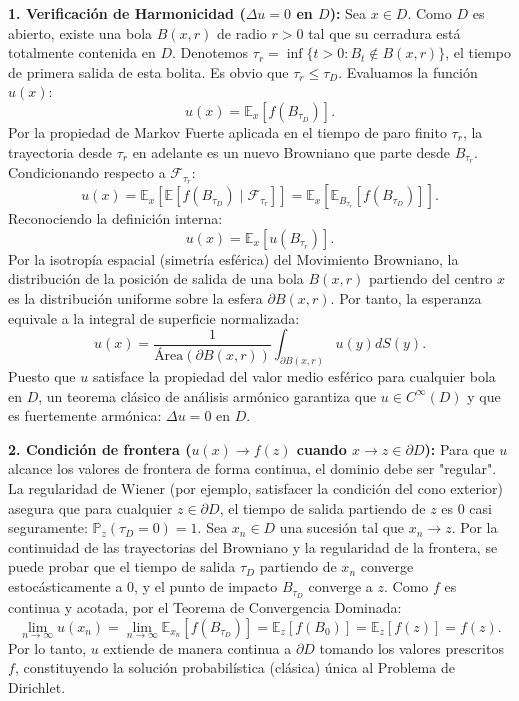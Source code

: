 \documentclass[11pt, letterpaper]{article}
\begin{document}
\begin{solucion}
    \textbf{1. Verificación de Harmonicidad ($\Delta u = 0$ en $D$):}
    Sea $x \in D$. Como $D$ es abierto, existe una bola $B(x, r)$ de radio $r > 0$ tal que su cerradura está totalmente contenida en $D$.
    Denotemos $\tau_r = \inf\{t > 0 : B_t \notin B(x, r)\}$, el tiempo de primera salida de esta bolita.
    Es obvio que $\tau_r \le \tau_D$.
    Evaluamos la función $u(x)$:
    \[ u(x) = \mathbb{E}_x[f(B_{\tau_D})]. \]
    Por la propiedad de Markov Fuerte aplicada en el tiempo de paro finito $\tau_r$, la trayectoria desde $\tau_r$ en adelante es un nuevo Browniano que parte desde $B_{\tau_r}$. Condicionando respecto a $\mathcal{F}_{\tau_r}$:
    \[ u(x) = \mathbb{E}_x \left[ \mathbb{E} [ f(B_{\tau_D}) \mid \mathcal{F}_{\tau_r} ] \right] = \mathbb{E}_x \left[ \mathbb{E}_{B_{\tau_r}} [ f(B_{\tau_D}) ] \right]. \]
    Reconociendo la definición interna:
    \[ u(x) = \mathbb{E}_x [ u(B_{\tau_r}) ]. \]
    Por la isotropía espacial (simetría esférica) del Movimiento Browniano, la distribución de la posición de salida de una bola $B(x,r)$ partiendo del centro $x$ es la distribución uniforme sobre la esfera $\partial B(x,r)$. Por tanto, la esperanza equivale a la integral de superficie normalizada:
    \[ u(x) = \frac{1}{\text{Área}(\partial B(x,r))} \int_{\partial B(x,r)} u(y) dS(y). \]
    Puesto que $u$ satisface la propiedad del valor medio esférico para cualquier bola en $D$, un teorema clásico de análisis armónico garantiza que $u \in C^\infty(D)$ y que es fuertemente armónica: $\Delta u = 0$ en $D$.

    \textbf{2. Condición de frontera ($u(x) \to f(z)$ cuando $x \to z \in \partial D$):}
    Para que $u$ alcance los valores de frontera de forma continua, el dominio debe ser "regular". La regularidad de Wiener (por ejemplo, satisfacer la condición del cono exterior) asegura que para cualquier $z \in \partial D$, el tiempo de salida partiendo de $z$ es 0 casi seguramente: $\mathbb{P}_z(\tau_D = 0) = 1$.
    Sea $x_n \in D$ una sucesión tal que $x_n \to z$. Por la continuidad de las trayectorias del Browniano y la regularidad de la frontera, se puede probar que el tiempo de salida $\tau_D$ partiendo de $x_n$ converge estocásticamente a 0, y el punto de impacto $B_{\tau_D}$ converge a $z$.
    Como $f$ es continua y acotada, por el Teorema de Convergencia Dominada:
    \[ \lim_{n \to \infty} u(x_n) = \lim_{n \to \infty} \mathbb{E}_{x_n}[f(B_{\tau_D})] = \mathbb{E}_z[f(B_0)] = \mathbb{E}_z[f(z)] = f(z). \]
    Por lo tanto, $u$ extiende de manera continua a $\partial D$ tomando los valores prescritos $f$, constituyendo la solución probabilística (clásica) única al Problema de Dirichlet.
\end{solucion}
\end{document}
